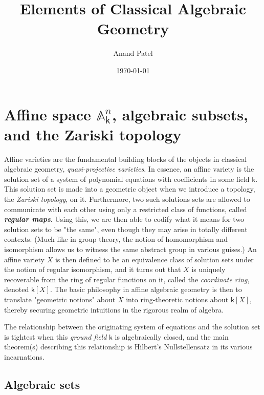 \documentclass[11pt]{article}
\author{Anand Patel}
\date{\today}
\title{Elements of Classical Algebraic Geometry}
\newcommand{\A}{\mathbb{A}}
\renewcommand{\k}{\mathsf{k}}
\newcommand{\A}{\mathbb A}
\renewcommand{\k}{\mathsf{k}}
\begin{document}
\maketitle

\section{Affine space \(\A^n_{\k}\), algebraic subsets, and the Zariski topology}
\label{sec:orge77b1ee}


Affine varieties are the fundamental building blocks of the objects in classical algebraic geometry, \emph{quasi-projective varieties}.  In essence, an affine variety is the  solution set of a system of polynomial equations with coefficients in some field \(\k\). This solution set is made into a geometric object when we introduce a topology, the \emph{Zariski topology}, on it.  Furthermore, two such solutions sets are allowed to communicate with each other using only a restricted class of functions, called \textbf{\emph{regular maps}}.  Using this, we are then able to codify what it means for two solution sets to be "the same", even though they may arise in totally different contexts.  (Much like in group theory, the notion of homomorphism and isomorphism allows us to witness the same abstract group in various guises.)  An affine variety \(X\) is then defined to be an equivalence class of solution sets under the notion of regular isomorphism, and it turns out that \(X\) is uniquely recoverable from the ring of regular functions on it, called the \emph{coordinate ring}, denoted \(\k[X]\).  The basic philosophy in affine algebraic geometry is then to translate "geometric notions" about \(X\) into ring-theoretic notions about \(\k[X]\), thereby securing geometric intuitions in the rigorous realm of algebra.

The relationship between the originating system of equations and the solution set is tightest when this \emph{ground field} \(\k\) is algebraically closed, and the main theorem(s) describing this relationship is Hilbert's Nullstellensatz in its various incarnations.  

\subsection{Algebraic sets}
\label{sec:orgd083713}
\end{document}
